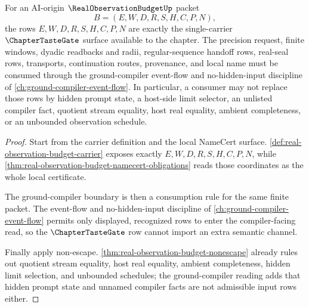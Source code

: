 \begin{theorem}
\label{thm:real-observation-budget-tastegate-ground-compiler-alignment}
For an AI-origin $\RealObservationBudgetUp$ packet
$$
B=(E,W,D,R,S,H,C,P,N),
$$
the rows $E,W,D,R,S,H,C,P,N$ are exactly the single-carrier $\ChapterTasteGate$ surface available to the chapter. The precision request, finite windows, dyadic readbacks and radii, regular-sequence handoff rows, real-seal rows, transports, continuation routes, provenance, and local name must be consumed through the ground-compiler event-flow and no-hidden-input discipline of \autoref{ch:ground-compiler-event-flow}. In particular, a consumer may not replace those rows by hidden prompt state, a host-side limit selector, an unlisted compiler fact, quotient stream equality, host real equality, ambient completeness, or an unbounded observation schedule.
\end{theorem}
\begin{proof}
Start from the carrier definition and the local NameCert surface. \autoref{def:real-observation-budget-carrier} exposes exactly $E,W,D,R,S,H,C,P,N$, while \autoref{thm:real-observation-budget-namecert-obligations} reads those coordinates as the whole local certificate.

The ground-compiler boundary is then a consumption rule for the same finite packet. The event-flow and no-hidden-input discipline of \autoref{ch:ground-compiler-event-flow} permits only displayed, recognized rows to enter the compiler-facing read, so the $\ChapterTasteGate$ row cannot import an extra semantic channel.

Finally apply non-escape. \autoref{thm:real-observation-budget-nonescape} already rules out quotient stream equality, host real equality, ambient completeness, hidden limit selection, and unbounded schedules; the ground-compiler reading adds that hidden prompt state and unnamed compiler facts are not admissible input rows either.
\end{proof}

